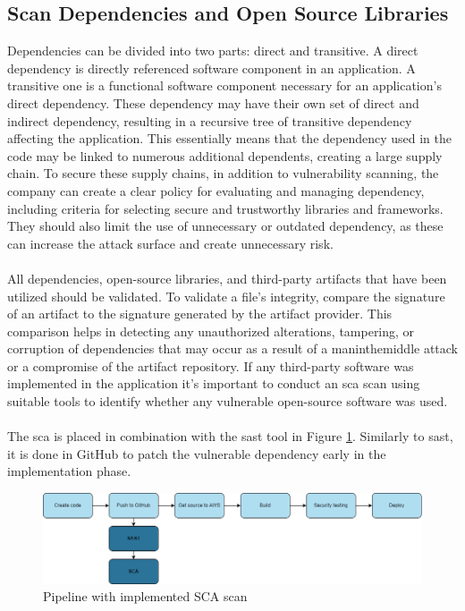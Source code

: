 \subsection{Scan Dependencies and Open Source Libraries}
\label{Scan Dependencies and Open Source Libraries}
Dependencies can be divided into two parts: direct and transitive. A direct dependency is directly referenced software component in an application. A transitive one is a functional software component necessary for an application's direct \gls{dependency}. These \gls{dependency} may have their own set of direct and indirect \gls{dependency}, resulting in a recursive tree of transitive \gls{dependency} affecting the application. This essentially means that the \gls{dependency} used in the code may be linked to numerous additional dependents, creating a large supply chain. To secure these supply chains, in addition to vulnerability scanning, the company can create a clear policy for evaluating and managing \gls{dependency}, including criteria for selecting secure and trustworthy libraries and frameworks. They should also limit the use of unnecessary or outdated \gls{dependency}, as these can increase the attack surface and create unnecessary risk. \cite{googledependency}
\\~\\
All dependencies, open-source libraries, and third-party \gls{artifact}s that have been utilized should be validated. To validate a file's integrity, compare the signature of an artifact to the signature generated by the artifact provider. This comparison helps in detecting any unauthorized alterations, tampering, or corruption of dependencies that may occur as a result of a \gls{maninthemiddle} attack or a compromise of the artifact repository. If any third-party software was implemented in the application it's important to conduct an \acrshort{sca} scan using suitable tools to identify whether any vulnerable open-source software was used. \cite{bestpracticeSupplyChain}
\\~\\
The \acrshort{sca} is placed in combination with the \acrshort{sast} tool in Figure \ref{fig: Pipeline with implemented SCA scan}. Similarly to \acrshort{sast}, it is done in GitHub to patch the vulnerable \gls{dependency} early in the implementation phase.

\vspace{2mm}
\begin{figure}[H]
    \centering
    \includegraphics[width=0.8\columnwidth]{Images/pipeline3.png}
    \caption{Pipeline with implemented SCA scan}
    \label{fig: Pipeline with implemented SCA scan}
\end{figure}


